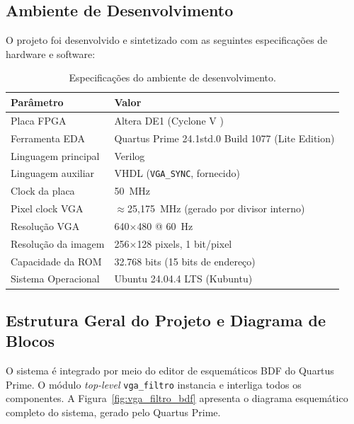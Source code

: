 \documentclass[12pt, a4paper]{article}
\begin{document}
	\subsection{Ambiente de Desenvolvimento}
	
	O projeto foi desenvolvido e sintetizado com as seguintes especificações de
	hardware e software:
	
	\begin{table}[H]
		\centering
		\caption{Especificações do ambiente de desenvolvimento.}
		\label{tab:ambiente}
		\begin{tabular}{ll}
			\toprule
			\textbf{Parâmetro}        & \textbf{Valor}                                     \\
			\midrule
			Placa FPGA                & Altera DE1 (Cyclone V )               \\
			Ferramenta EDA            & Quartus Prime 24.1std.0 Build 1077 (Lite Edition)  \\
			Linguagem principal       & Verilog                                            \\
			Linguagem auxiliar        & VHDL (\texttt{VGA\_SYNC}, fornecido)               \\
			Clock da placa            & 50~MHz                                             \\
			Pixel clock VGA           & $\approx$25,175~MHz (gerado por divisor interno)   \\
			Resolução VGA             & 640$\times$480 @ 60~Hz                             \\
			Resolução da imagem       & 256$\times$128 pixels, 1 bit/pixel                 \\
			Capacidade da ROM         & 32.768 bits (15 bits de endereço)                  \\
			Sistema Operacional       & Ubuntu 24.04.4 LTS (Kubuntu)                       \\
			\bottomrule
		\end{tabular}
	\end{table}
	
	\subsection{Estrutura Geral do Projeto e Diagrama de Blocos}
	
	O sistema é integrado por meio do editor de esquemáticos BDF do Quartus Prime.
	O módulo \textit{top-level} \texttt{vga\_filtro} instancia e interliga todos os
	componentes. A Figura~\ref{fig:vga_filtro_bdf} apresenta o diagrama esquemático
	completo do sistema, gerado pelo Quartus Prime.
	
\end{document}
